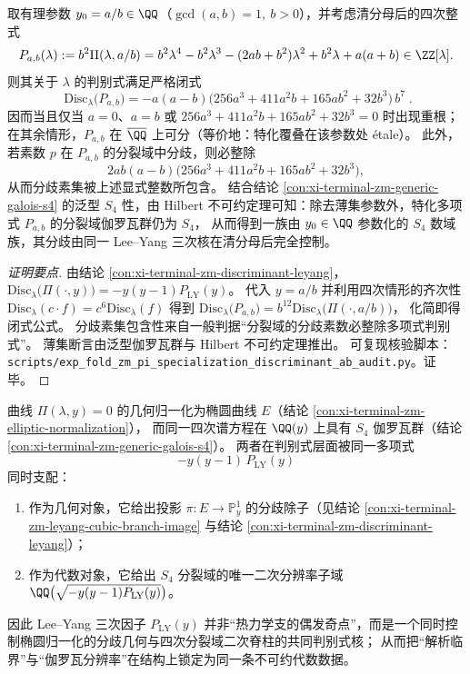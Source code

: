 \begin{conclusion}\label{con:xi-terminal-zm-specialization-discriminant-ab}
取有理参数 \(y_0=a/b\in\QQ\)（\(\gcd(a,b)=1,\ b>0\)），并考虑清分母后的四次整式
\[
P_{a,b}(\lambda):=b^{2}\Pi(\lambda,a/b)
=b^{2}\lambda^{4}-b^{2}\lambda^{3}-(2ab+b^{2})\lambda^{2}+b^{2}\lambda+a(a+b)\in\ZZ[\lambda].
\]
则其关于 \(\lambda\) 的判别式满足严格闭式
\[
\boxed{\;
\mathrm{Disc}_{\lambda}\bigl(P_{a,b}\bigr)
=-a(a-b)\bigl(256a^{3}+411a^{2}b+165ab^{2}+32b^{3}\bigr)\,b^{7}\; }.
\]
因而当且仅当 \(a=0\)、\(a=b\) 或 \(256a^{3}+411a^{2}b+165ab^{2}+32b^{3}=0\) 时出现重根；
在其余情形，\(P_{a,b}\) 在 \(\overline\QQ\) 上可分（等价地：特化覆叠在该参数处 \'{e}tale）。
此外，若素数 \(p\) 在 \(P_{a,b}\) 的分裂域中分歧，则必整除
\[
2ab(a-b)\bigl(256a^{3}+411a^{2}b+165ab^{2}+32b^{3}\bigr),
\]
从而分歧素集被上述显式整数所包含。
结合结论 \ref{con:xi-terminal-zm-generic-galois-s4} 的泛型 \(S_4\) 性，由 Hilbert 不可约定理可知：除去薄集参数外，特化多项式 \(P_{a,b}\) 的分裂域伽罗瓦群仍为 \(S_4\)，
从而得到一族由 \(y_0\in\QQ\) 参数化的 \(S_4\) 数域族，其分歧由同一 Lee--Yang 三次核在清分母后完全控制。
\end{conclusion}
\begin{proof}[证明要点]
由结论 \ref{con:xi-terminal-zm-discriminant-leyang}，
\(
\mathrm{Disc}_{\lambda}\bigl(\Pi(\cdot,y)\bigr)=-y(y-1)P_{\mathrm{LY}}(y)
\)。
代入 \(y=a/b\) 并利用四次情形的齐次性
\(
\mathrm{Disc}_{\lambda}(c\cdot f)=c^{6}\mathrm{Disc}_{\lambda}(f)
\)
得到
\(
\mathrm{Disc}_{\lambda}\bigl(P_{a,b}\bigr)=b^{12}\mathrm{Disc}_{\lambda}\bigl(\Pi(\cdot,a/b)\bigr)
\)，
化简即得闭式公式。
分歧素集包含性来自一般判据“分裂域的分歧素数必整除多项式判别式”。
薄集断言由泛型伽罗瓦群与 Hilbert 不可约定理推出。
可复现核验脚本：\texttt{scripts/exp\_fold\_zm\_pi\_specialization\_discriminant\_ab\_audit.py}。证毕。
\end{proof}

\begin{conclusion}\label{con:xi-terminal-zm-elliptic-s4-leyang-triple-duality}
曲线 \(\Pi(\lambda,y)=0\) 的几何归一化为椭圆曲线 \(E\)（结论 \ref{con:xi-terminal-zm-elliptic-normalization}），
而同一四次谱方程在 \(\QQ(y)\) 上具有 \(S_4\) 伽罗瓦群（结论 \ref{con:xi-terminal-zm-generic-galois-s4}）。
两者在判别式层面被同一多项式
\[
-y(y-1)\,P_{\mathrm{LY}}(y)
\]
同时支配：
\begin{enumerate}
  \item 作为几何对象，它给出投影 \(\pi:E\to\mathbb P^1_y\) 的分歧除子（见结论 \ref{con:xi-terminal-zm-leyang-cubic-branch-image} 与结论 \ref{con:xi-terminal-zm-discriminant-leyang}）；
  \item 作为代数对象，它给出 \(S_4\) 分裂域的唯一二次分辨率子域 \(\QQ\bigl(\sqrt{-y(y-1)P_{\mathrm{LY}}(y)}\bigr)\)。
\end{enumerate}
因此 Lee--Yang 三次因子 \(P_{\mathrm{LY}}(y)\) 并非“热力学支的偶发奇点”，而是一个同时控制椭圆归一化的分歧几何与四次分裂域二次脊柱的共同判别式核；
从而把“解析临界”与“伽罗瓦分辨率”在结构上锁定为同一条不可约代数数据。
\end{conclusion}



